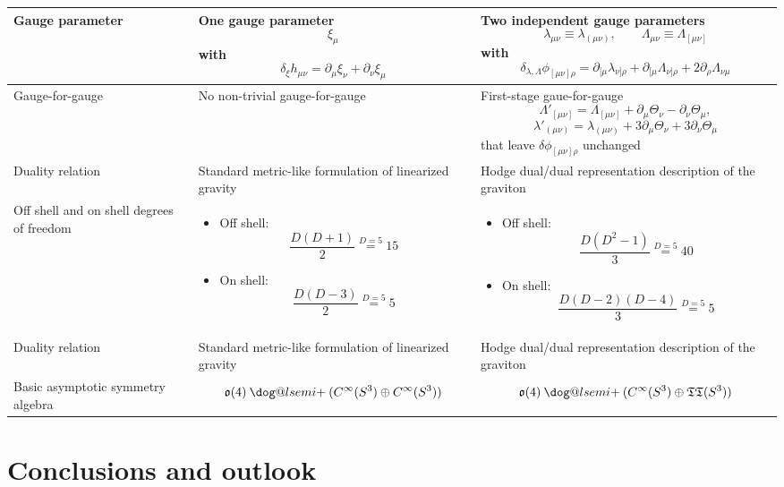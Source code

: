 \documentclass[a4paper,12pt]{article}
\makeatletter
\DeclareRobustCommand{\loplus}{\mathbin{\mathpalette\dog@lsemi{+}}}
\newcommand{\dog@lsemi}[2]{\dog@semi{#1}{#2}{270,90}}
\newcommand{\dog@semi}[3]{%
  \begingroup
  \sbox\z@{$\m@th#1#2$}%
  \setlength{\unitlength}{\dimexpr\ht\z@+\dp\z@\relax}%
  \makebox[\wd\z@]{\raisebox{-\dp\z@}{%
    \begin{picture}(1,1)
    \linethickness{\variable@rule{#1}}
    \roundcap
    \put(0.5,0.5){\makebox(0,0){\raisebox{\dp\z@}{$\m@th#1#2$}}}
    \put(0.5,0.5){\arc[#3]{0.5}}
    \end{picture}%
  }}%
  \endgroup
}
\newcommand{\variable@rule}[1]{%
  \fontdimen8  
  \ifx#1\displaystyle\textfont3\else
    \ifx#1\textstyle\textfont3\else
      \ifx#1\scriptstyle\scriptfont3\else
        \scriptscriptfont3\relax
  \fi\fi\fi
}
\makeatother
\begin{document}
\begin{longtable}{|p{3.2cm}|p{4.4cm}|p{6.2cm}|}
Gauge parameter & One gauge parameter
\[
\xi_{\mu}
\]
with
\[
\delta_{\xi} h_{\mu \nu}=\partial_{\mu}\xi_{\nu}+\partial_{\nu}\xi_{\mu}
\]
& Two independent gauge parameters
\[
\lambda_{\mu \nu}\equiv\lambda_{(\mu \nu)}, \qquad \Lambda_{\mu \nu}\equiv\Lambda_{[\mu \nu]}
\]
with
\[
\delta_{\lambda,\Lambda} \phi_{[\mu \nu]\rho}
=
\partial_{[\mu}\lambda_{\nu] \rho}
+\partial_{[\mu}\Lambda_{\nu] \rho}
+2\partial_{\rho}\Lambda_{\nu \mu}
\]
\\
\hline
Gauge-for-gauge & No non-trivial gauge-for-gauge & First-stage gaue-for-gauge
\[
\Lambda'_{[\mu \nu]}= \Lambda_{[\mu \nu]}+\partial_{\mu}\Theta_{\nu}-\partial_{\nu}\Theta_{\mu},
\]
\[
\lambda'_{(\mu \nu)}= \lambda_{(\mu \nu)}+3\partial_{\mu}\Theta_{\nu}+3\partial_{\nu}\Theta_{\mu}
\]
that leave \( \delta\phi_{[\mu \nu]\rho} \) unchanged \\
\hline    
Duality relation & Standard metric-like formulation of linearized gravity& Hodge dual/dual representation description of the graviton \\
\hline
Off shell and on shell degrees of freedom & \begin{itemize}
    \item Off shell: \[
\frac{D(D+1)}{2}\overset{\text{$D=5$}}{=}15
\]
    \item On shell: \[
\frac{D(D-3)}{2}\overset{\text{$D=5$}}{=}5
\]
\end{itemize}
 & \begin{itemize}
   \item Off shell: \[
\frac{D(D^2-1)}{3}\overset{\text{$D=5$}}{=}40
\]
    \item On shell: \[
\frac{D(D-2)(D-4)}{3}\overset{\text{$D=5$}}{=}5
\]
\end{itemize}
\\
\hline
Duality relation & Standard metric-like formulation of linearized gravity& Hodge dual/dual representation description of the graviton \\
\hline
Basic asymptotic symmetry algebra & $$\mathfrak{o}(4) \loplus (C^{\infty}(S^3)\oplus C^{\infty}(S^3))$$ & $$\mathfrak{o}(4) \loplus (C^{\infty}(S^3)\oplus \mathfrak{TT}(S^3))$$\\
\hline
\end{longtable}



\section{Conclusions and outlook}
\end{document}
